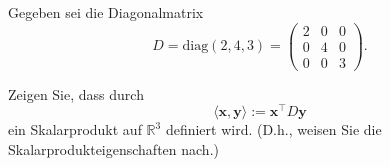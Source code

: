 
Gegeben sei die Diagonalmatrix
\[
D = \text{diag}(2,4,3) = \begin{pmatrix}
2 & 0 & 0 \\
0 & 4 & 0 \\
0 & 0 & 3
\end{pmatrix}.
\]

Zeigen Sie, dass durch
\[
\langle \mathbf{x}, \mathbf{y} \rangle := \mathbf{x}^\top D \mathbf{y}
\]
ein Skalarprodukt auf $\mathbb{R}^3$ definiert wird. (D.h., weisen Sie die Skalarprodukteigenschaften nach.)
